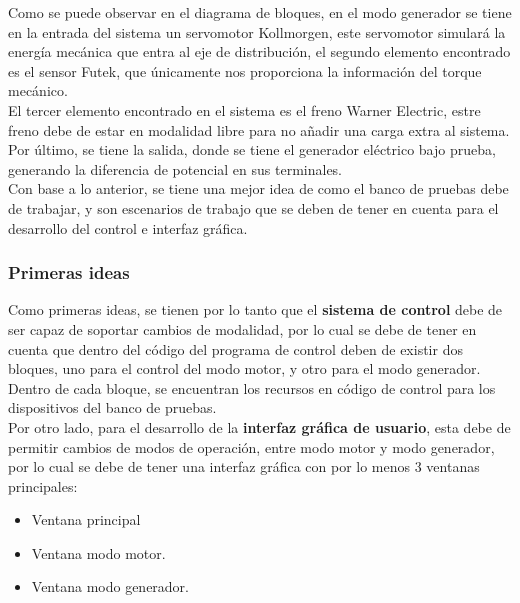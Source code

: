 \documentclass[12pt,titlepage]{article}
\begin{document}
Como se puede observar en el diagrama de bloques, en el modo generador se tiene en la entrada del sistema un servomotor Kollmorgen, este servomotor simulará la energía mecánica que entra al eje de distribución, el segundo elemento encontrado es el sensor Futek, que únicamente nos proporciona la información del torque mecánico. \\ 

El tercer elemento encontrado en el sistema es el freno Warner Electric, estre freno debe de estar en modalidad libre para no añadir una carga extra al sistema. \\ 

Por último, se tiene la salida, donde se tiene el generador eléctrico bajo prueba, generando la diferencia de potencial en sus terminales. \\

Con base a lo anterior, se tiene una mejor idea de como el banco de pruebas debe de trabajar, y son escenarios de trabajo que se deben de tener en cuenta para el desarrollo del control e interfaz gráfica. \\ 

\subsubsection{Primeras ideas}
Como primeras ideas, se tienen por lo tanto que el \textbf{sistema de control} debe de ser capaz de soportar cambios de modalidad, por lo cual se debe de tener en cuenta que dentro del código del programa de control deben de existir dos bloques, uno para el control del modo motor, y otro para el modo generador. \\ 

Dentro de cada bloque, se encuentran los recursos en código de control para los dispositivos del banco de pruebas. \\
\newpage
Por otro lado, para el desarrollo de la \textbf{interfaz gráfica de usuario}, esta debe de permitir cambios de modos de operación, entre modo motor y modo generador, por lo cual se debe de tener una interfaz gráfica con por lo menos 3 ventanas principales: \\

\begin{itemize}
\item Ventana principal
\item Ventana modo motor. 
\item Ventana modo generador.
\end{itemize}
\end{document}
